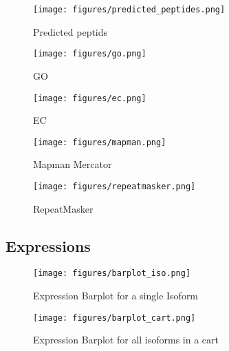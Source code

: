 \documentclass[english]{scrartcl}
\begin{document}
\begin{figure}
\begin{center}
  \texttt{[image: figures/predicted\_peptides.png]}
  \caption{Predicted peptids}
  \label{fig:predpep}
\end{center}
\end{figure}

\begin{figure}
\begin{center}
  \texttt{[image: figures/go.png]}
  \caption{GO}
  \label{fig:go}
\end{center}
\end{figure}

\begin{figure}
\begin{center}
  \texttt{[image: figures/ec.png]}
  \caption{EC}
  \label{fig:ec}
\end{center}
\end{figure}

\begin{figure}
\begin{center}
  \texttt{[image: figures/mapman.png]}
  \caption{Mapman Mercator}
  \label{fig:mapman}
\end{center}
\end{figure}

\begin{figure}
\begin{center}
  \texttt{[image: figures/repeatmasker.png]}
  \caption{RepeatMasker}
  \label{fig:repeatmasker}
\end{center}
\end{figure}

\subsection{Expressions}
\begin{figure}
\begin{center}
  \texttt{[image: figures/barplot\_iso.png]}
  \caption{Expression Barplot for a single Isoform}
  \label{fig:barplot_iso}
\end{center}
\end{figure}
\begin{figure}
\begin{center}
  \texttt{[image: figures/barplot\_cart.png]}
  \caption{Expression Barplot for all isoforms in a cart}
  \label{fig:barplot_cart}
\end{center}
\end{figure}
\end{document}
